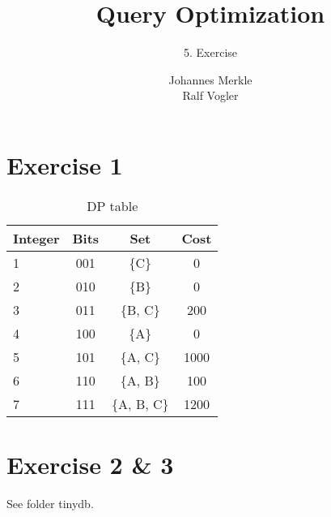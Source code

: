 \documentclass[11pt,a4paper]{scrartcl}
\begin{document}
\author{Johannes Merkle\\Ralf Vogler}
\title{Query Optimization}
\subtitle{5. Exercise}

\maketitle

\section*{Exercise 1}


\begin{table}[H]
  \caption{DP table}
  \begin{center}
 \begin{tabular}{l|c|c|c}
Integer & Bits & Set & Cost\\
\hline
1 & 001 & \{C\} 		& 0\\
2 & 010 & \{B\} 		& 0\\
3 & 011 & \{B, C\} 		& 200\\
4 & 100 & \{A\} 		& 0\\
5 & 101 & \{A, C\} 		& 1000\\
6 & 110 & \{A, B\} 		& 100\\
7 & 111 & \{A, B, C\} 	& 1200\\
 \end{tabular}  
  \end{center}
 \label{tab:gp1}
\end{table}

\section*{Exercise 2 \& 3}
See folder tinydb.
\end{document}
